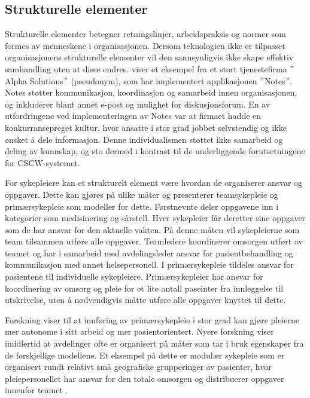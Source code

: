\subsection{Strukturelle elementer}
\label{sec:strukturelle_elementer}
Strukturelle elementer betegner retningslinjer, arbeidspraksis og normer som formes av menneskene i organisasjonen. Dersom teknologien ikke er tilpasset organisasjonens strukturelle elementer vil den sannsynligvis ikke skape effektiv samhandling uten at disse endres. \citet{Orlikowski92} viser et eksempel fra et stort tjenestefirma $"$Alpha Solutions$"$ (pseudonym), som har implementert applikasjonen $"$Notes$"$. Notes støtter kommunikasjon, koordinasjon og samarbeid innen organisasjonen, og inkluderer blant annet e-post og mulighet for diskusjonsforum. En av utfordringene ved implementeringen av Notes var at firmaet hadde en konkurransepreget kultur, hvor ansatte i stor grad jobbet selvstendig og ikke ønsket å dele informasjon. Denne individualismen støttet ikke samarbeid og deling av kunnskap, og sto dermed i kontrast til de underliggende forutsetningene for CSCW-systemet. 

\noindent
For sykepleiere kan et strukturelt element være hvordan de organiserer ansvar og oppgaver. Dette kan gjøres på ulike måter og \citet{Rygh13} presenterer teamsykepleie og primærsykepleie som modeller for dette. Førstnevnte deler oppgavene inn i kategorier som medisinering og sårstell. Hver sykepleier får deretter sine oppgaver som de har ansvar for den aktuelle vakten. På denne måten vil sykepleierne som team tilsammen utføre alle oppgaver. Teamledere koordinerer omsorgen utført av teamet og har i samarbeid med avdelingsleder ansvar for pasientbehandling og kommunikasjon med annet helsepersonell. I primærsykepleie tildeles ansvar for pasientene til individuelle sykepleiere. Primærsykepleier har ansvar for koordinering av omsorg og pleie for et lite antall paseinter fra innleggelse til utskrivelse, uten å nødvendigvis måtte utføre alle oppgaver knyttet til dette. 

\noindent
Forskning viser til at innføring av primærsykepleie i stor grad kan gjøre pleierne mer autonome i sitt arbeid og mer pasientorientert. Nyere forskning viser imidlertid at avdelinger ofte er organisert på måter som tar i bruk egenskaper fra de forskjellige modellene. Et eksempel på dette er modulær sykepleie som er organisert rundt relativt små geografiske grupperinger av pasienter, hvor pleiepersonellet har ansvar for den totale omsorgen og distribuerer oppgaver innenfor teamet \citep{Rygh13}.

